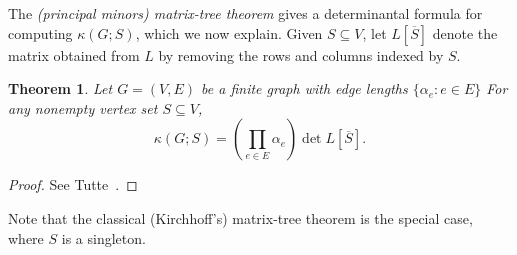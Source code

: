\documentclass[12pt]{amsart}
\newtheorem{thm}{Theorem}[section]
\theoremstyle{definition}
\newcommand{\La}{L}
\newcommand{\trees}{\mathcal{F}_1}
\begin{document}



The {\em (principal minors) matrix-tree theorem} gives a determinantal formula for computing $\kappa(G;S)$, which we now explain. 
Given $S \subseteq V$, let $L[\overline S]$ denote the matrix obtained from $L$ by removing the rows and columns indexed by $S$.


\begin{thm}
\label{thm:matrix-tree}
Let $G = (V,E)$ be a finite graph with edge lengths $\{ \alpha_e \colon e \in E\}$
%
For any nonempty vertex set $S \subseteq V$,
\begin{equation}
	\kappa( G ; S) = \left(\prod_{e \in E} \alpha_e \right) \det L[\overline S] .
\end{equation}
\end{thm}
\begin{proof}
See Tutte~\cite[Section VI.6, Equation (VI.6.7)]{tutte}.
\end{proof}
Note that the classical (Kirchhoff's) matrix-tree theorem is the special case, where $S$ is a singleton.
\end{document}

